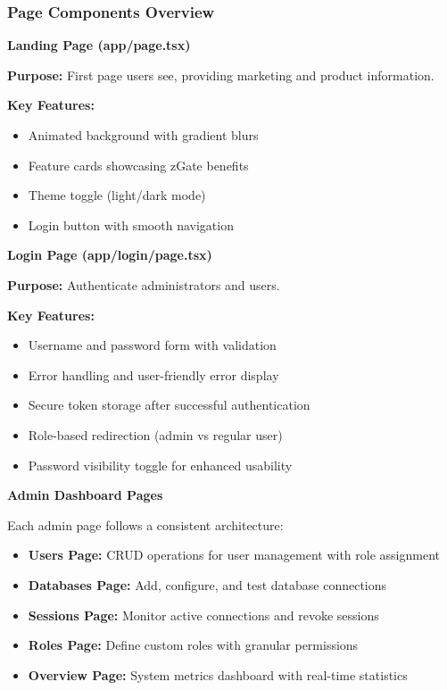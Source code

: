 \subsubsection{Page Components Overview}

\textbf{Landing Page (app/page.tsx)}

\textbf{Purpose:} First page users see, providing marketing and product information.

\textbf{Key Features:}
\begin{itemize}
    \item Animated background with gradient blurs
    \item Feature cards showcasing zGate benefits
    \item Theme toggle (light/dark mode)
    \item Login button with smooth navigation
\end{itemize}

\textbf{Login Page (app/login/page.tsx)}

\textbf{Purpose:} Authenticate administrators and users.

\textbf{Key Features:}
\begin{itemize}
    \item Username and password form with validation
    \item Error handling and user-friendly error display
    \item Secure token storage after successful authentication
    \item Role-based redirection (admin vs regular user)
    \item Password visibility toggle for enhanced usability
\end{itemize}

\textbf{Admin Dashboard Pages}

Each admin page follows a consistent architecture:
\begin{itemize}
    \item \textbf{Users Page:} CRUD operations for user management with role assignment
    \item \textbf{Databases Page:} Add, configure, and test database connections
    \item \textbf{Sessions Page:} Monitor active connections and revoke sessions
    \item \textbf{Roles Page:} Define custom roles with granular permissions
    \item \textbf{Overview Page:} System metrics dashboard with real-time statistics
\end{itemize}

